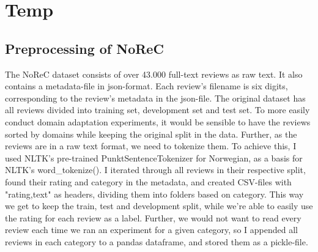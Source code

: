 \chapter{Temp}
\label{sec:lab}
\section{Preprocessing of NoReC}
The NoReC dataset consists of over 43.000 full-text reviews as raw text. It also contains a metadata-file in json-format. Each review's filename is six digits, corresponding to the review's metadata in the json-file. The original dataset has all reviews divided into training set, development set and test set. To more easily conduct domain adaptation experiments, it would be sensible to have the reviews sorted by domains while keeping the original split in the data. Further, as the reviews are in a raw text format, we need to tokenize them. To achieve this, I used NLTK's pre-trained PunktSentenceTokenizer for Norwegian, as a basis for NLTK's word\_tokenize(). I iterated through all reviews in their respective split, found their rating and category in the metadata, and created CSV-files with "rating,text" as headers, dividing them into folders based on category. This way we get to keep the train, test and development split, while we're able to easily use the rating for each review as a label. Further, we would not want to read every review each time we ran an experiment for a given category, so I appended all reviews in each category to a pandas dataframe, and stored them as a pickle-file.
